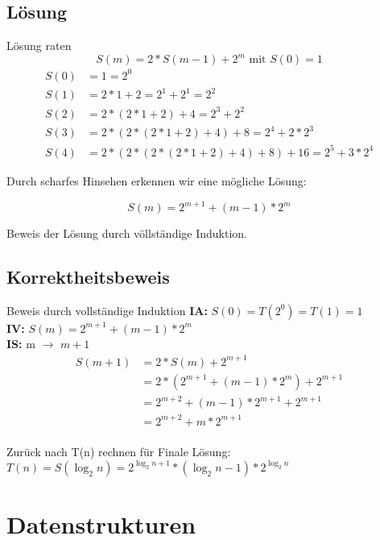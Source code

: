 \documentclass[18pt]{beamer}
\begin{document}
\subsection{Lösung}
\begin{frame}{Lösung raten}
	\[
		S(m) = 2 * S(m-1) + 2^m \text{ mit } S(0) = 1
	\]
	\begin{align*}
		S(0) &= 1 = 2^0\\
		S(1) &= 2 * 1 + 2 = 2^1 + 2^1 = 2^2\\
		S(2) &= 2 * (2 * 1 + 2) + 4 = 2^3 + 2^2\\
		S(3) &= 2 * (2 * (2 * 1 + 2) + 4 ) + 8 = 2^4 + 2 * 2^3\\
		S(4) &= 2 * ( 2 * (2 * (2 * 1 + 2) + 4 ) + 8 ) + 16 = 2^5 + 3 * 2^4
	\end{align*}

	Durch scharfes Hinsehen erkennen wir eine mögliche Lösung:

	$$S(m) = 2^{m+1} + (m-1) * 2^{m}$$

	Beweis der Lösung durch völlständige Induktion.
\end{frame}

\subsection{Korrektheitsbeweis}
\begin{frame}{Beweis durch vollständige Induktion}
	\textbf{IA:} $S(0) = T(2^0) = T(1) = 1$ \\
	\textbf{IV:} $S(m) = 2^{m+1} + (m - 1)*2^{m}$\\
	\textbf{IS:} m $\rightarrow$ $m+1$
	\begin{align}
		S(m+1)& = 2 * S(m) + 2^{m+1} \\
		& = 2 * ( 2^{m+1} + (m-1) * 2^m) + 2^{m+1} \\
		& = 2^{m+2} + (m-1) * 2^{m+1} + 2^{m+1} \\
		& = 2^{m+2} + m * 2^{m+1}
	\end{align}
	\ \\
	Zurück nach T(n) rechnen für Finale Lösung: \\
	$T(n) = S(\log _2 n) = 2^{\log _2 n + 1} * (\log _2 n - 1) * 2 ^{\log _2 n}$
\end{frame}

\section{Datenstrukturen}
\end{document}
